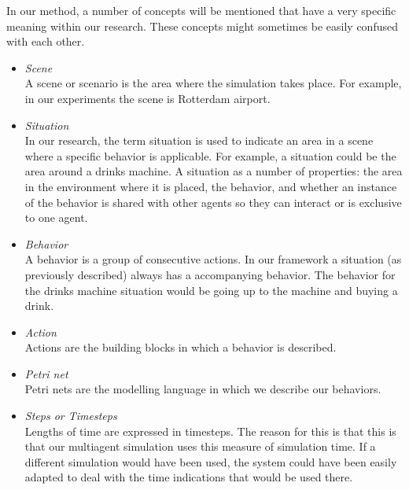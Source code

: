 \documentclass[11pt, a4paper]{book}
\begin{document}
In our method, a number of concepts will be mentioned that have a very specific meaning within our research. These concepts might sometimes be easily confused with each other.
\begin{itemize}
\item \emph{Scene}\\
A scene or scenario is the area where the simulation takes place. For example, in our experiments the scene is Rotterdam airport.
\item \emph{Situation}\\
In our research, the term situation is used to indicate an area in a scene where a specific behavior is applicable. For example, a situation could be the area around a drinks machine. A situation as a number of properties: the area in the environment where it is placed, the behavior, and whether an instance of the behavior is shared with other agents so they can interact or is exclusive to one agent.
\item \emph{Behavior}\\
A behavior is a group of consecutive actions. In our framework a situation (as previously described) always has a accompanying behavior. The behavior for the drinks machine situation would be going up to the machine and buying a drink.
\item \emph{Action}\\
Actions are the building blocks in which a behavior is described.
\item \emph{Petri net}\\
Petri nets are the modelling language in which we describe our behaviors.
\item \emph{Steps or Timesteps}\\
Lengths of time are expressed in timesteps. The reason for this is that this is that our multiagent simulation uses this measure of simulation time. If a different simulation would have been used, the system could have been easily adapted to deal with the time indications that would be used there.

\end{itemize}
\end{document}
